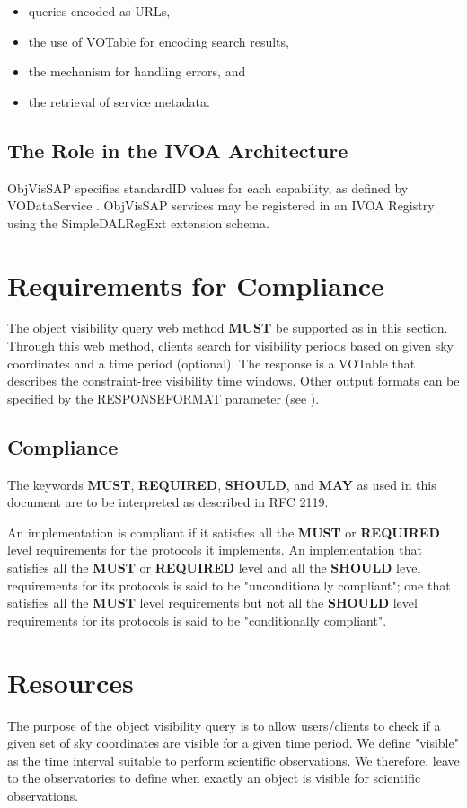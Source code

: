 \documentclass[11pt,a4paper]{ivoa}
\begin{document}
\begin{itemize}
\item queries encoded as URLs,
\item the use of VOTable for encoding search results,
\item the mechanism for handling errors, and
\item the retrieval of service metadata.
\end{itemize}


\subsection{The Role in the IVOA Architecture}
ObjVisSAP specifies standardID values \citep{2016ivoa.spec.0523D} for each
capability, as defined by VODataService \citep{2010ivoa.spec.1202P}. ObjVisSAP
services may be registered in an IVOA Registry using the SimpleDALRegExt
\citep{2017ivoa.spec.0530P} extension schema.


\section{Requirements for Compliance}
The object visibility query web method \textbf{MUST} be supported as
in this section. Through this web method, clients search for visibility
periods based on given sky coordinates and a time period (optional). The
response is a VOTable that describes the constraint-free visibility time
windows. Other output formats can be specified by the RESPONSEFORMAT
parameter (see \citet{2017ivoa.spec.0517D}).

\subsection{Compliance}
The keywords \textbf{MUST}, \textbf{REQUIRED}, \textbf{SHOULD},
and \textbf{MAY} as used in this document are to be interpreted as
described in RFC 2119.

An implementation is compliant if it satisfies all the \textbf{MUST}
or \textbf{REQUIRED} level requirements for the protocols it
implements. An implementation that satisfies all the \textbf{MUST} or
\textbf{REQUIRED} level and all the \textbf{SHOULD} level
requirements for its protocols is said to be "unconditionally
compliant"; one that satisfies all the \textbf{MUST} level
requirements but not all the \textbf{SHOULD} level requirements for
its protocols is said to be "conditionally compliant".

\section{Resources}
The purpose of the object visibility query is to allow users/clients to
check if a given set of sky coordinates are visible for a given time
period. We define "visible" as the time interval suitable to perform
scientific observations. We therefore, leave to the observatories to
define when exactly an object is visible for scientific observations.
\end{document}
